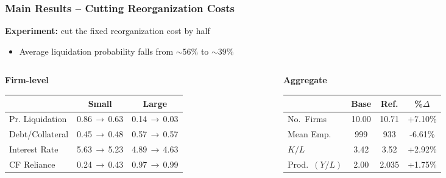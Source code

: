 \documentclass[aspectratio=169,xcolor=table]{beamer}
\begin{document}
\begin{frame}[label=effects] \frametitle{Main Results -- Cutting Reorganization Costs}

\textbf{Experiment:} cut the fixed reorganization cost by half
\begin{itemize} \small
    \item Average liquidation probability falls from $\sim 56\%$ to $\sim 39\%$
\end{itemize} \normalsize \vspace{1mm}

\begin{columns}[T,onlytextwidth]
\begin{column}{0.57\textwidth}
\centering \footnotesize
\textbf{Firm-level} \\[1mm]
\renewcommand{\arraystretch}{0.95}
\begin{tabular}{lcc}
\toprule
 & \textbf{Small} & \textbf{Large} \\
\midrule
Pr. Liquidation & 0.86\,$\to$\,\textcolor{primary}{0.63} & 0.14\,$\to$\,\textcolor{primary}{0.03} \\
Debt/Collateral & 0.45\,$\to$\,\textcolor{primary}{0.48} & 0.57\,$\to$\,\textcolor{primary}{0.57} \\
Interest Rate   & 5.63\,$\to$\,\textcolor{primary}{5.23} & 4.89\,$\to$\,\textcolor{primary}{4.63} \\
CF Reliance     & 0.24\,$\to$\,\textcolor{primary}{0.43} & 0.97\,$\to$\,\textcolor{primary}{0.99} \\
\bottomrule
\end{tabular}
\end{column}

\pause

\begin{column}{0.42\textwidth}
\centering \footnotesize
\textbf{Aggregate}\\[1mm]
\renewcommand{\arraystretch}{0.95}
\begin{tabular}{lccc}
\toprule
 & \textbf{Base} & \textbf{Ref.} & \textbf{\%$\Delta$} \\
\midrule
No.\ Firms & 10.00 & 10.71 & +7.10\% \\
Mean Emp. & 999 & 933 & -6.61\% \\
$K/L$ & 3.42 & 3.52 & +2.92\% \\
Prod.\ $(Y/L)$ & 2.00 & 2.035 & \textcolor{primary}{+1.75\%} \\
\bottomrule
\end{tabular}
\end{column}
\end{columns}
\vspace{4mm}


\end{frame}
\end{document}
